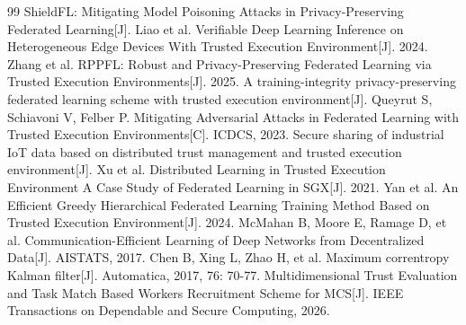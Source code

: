 \documentclass[runningheads,orivec]{llncs}
\begin{document}
\begin{thebibliography}{99}
     ShieldFL: Mitigating Model Poisoning Attacks in Privacy-Preserving Federated Learning[J].
     Liao et al. Verifiable Deep Learning Inference on Heterogeneous Edge Devices With Trusted Execution Environment[J]. 2024.
     Zhang et al. RPPFL: Robust and Privacy-Preserving Federated Learning via Trusted Execution Environments[J]. 2025.
     A training-integrity privacy-preserving federated learning scheme with trusted execution environment[J].
     Queyrut S, Schiavoni V, Felber P. Mitigating Adversarial Attacks in Federated Learning with Trusted Execution Environments[C]. ICDCS, 2023.
     Secure sharing of industrial IoT data based on distributed trust management and trusted execution environment[J].
     Xu et al. Distributed Learning in Trusted Execution Environment A Case Study of Federated Learning in SGX[J]. 2021.
     Yan et al. An Efficient Greedy Hierarchical Federated Learning Training Method Based on Trusted Execution Environment[J]. 2024.
     McMahan B, Moore E, Ramage D, et al. Communication-Efficient Learning of Deep Networks from Decentralized Data[J]. AISTATS, 2017.
     Chen B, Xing L, Zhao H, et al. Maximum correntropy Kalman filter[J]. Automatica, 2017, 76: 70-77.
     Multidimensional Trust Evaluation and Task Match Based Workers Recruitment Scheme for MCS[J]. IEEE Transactions on Dependable and Secure Computing, 2026.
\end{thebibliography}
\end{document}
